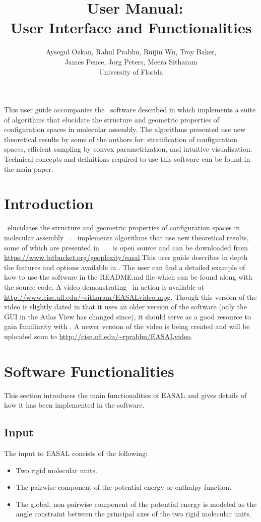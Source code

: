 \documentclass[10pt]{article}
\title{\EASAL~User Manual: \\User Interface and Functionalities}
\author{Aysegul Ozkan, Rahul Prabhu, Ruijin Wu, Troy Baker, \\James Pence, Jorg
Peters, Meera Sitharam \\ University of Florida}
\begin{document}
\maketitle
This user guide accompanies the \EASAL~software described in
\cite{Ozkan2014TOMS} which implements a suite of algorithms that elucidate the
structure and geometric properties of configuration spaces in molecular
assembly. The algorithms presented use new theoretical results by some
of the authors for: stratification of configuration
spaces, efficient sampling by convex
parametrization, and intuitive visualization. Technical concepts
and definitions required to use this software can be found in the main paper.


\section{Introduction}
 \EASAL\ elucidates the structure and geometric properties of configuration spaces in molecular assembly ~\cite{Sitharam:2012:EASAL, Ozkan2014MainEasal,
Wu2014Virus}. \EASAL\ implements algorithms that use new theoretical results, some of which are presented in ~\cite{Ozkan2014TOMS, Ozkan2014MainEasal, Gao, Sitharam:2012:EASAL}.
\EASAL~is open source and can be downloaded from \url{https://www.bitbucket.org/geoplexity/easal}.This user guide describes in
depth the features and options available in \EASAL.  The user can find a
detailed example of how to use the software in the README.md file which can be
found along with the source code. A video demonstrating \EASAL~in action is
available at \url{http://www.cise.ufl.edu/~sitharam/EASALvideo.mpg}.  Though
this version of the video is slightly dated in that it uses an older version of
the software (only the GUI in the Atlas View has changed since), it should
serve as a good resource to gain familiarity with \EASAL. A newer version of
the video is being created and will be uploaded soon to
\url{http://cise.ufl.edu/~rprabhu/EASALvideo}.


\section{Software Functionalities}
This section introduces the main functionalities of EASAL and gives details of how it has been implemented in the software.
\subsection{Input}
The input to EASAL consists of the following:
\begin{itemize}
\item Two rigid molecular units.
\item The pairwise component of the potential energy or enthalpy function.
\item The global, non-pairwise component of the potential energy is modeled as the angle
constraint between the principal axes of the two rigid molecular units.
\end{itemize}
\end{document}
